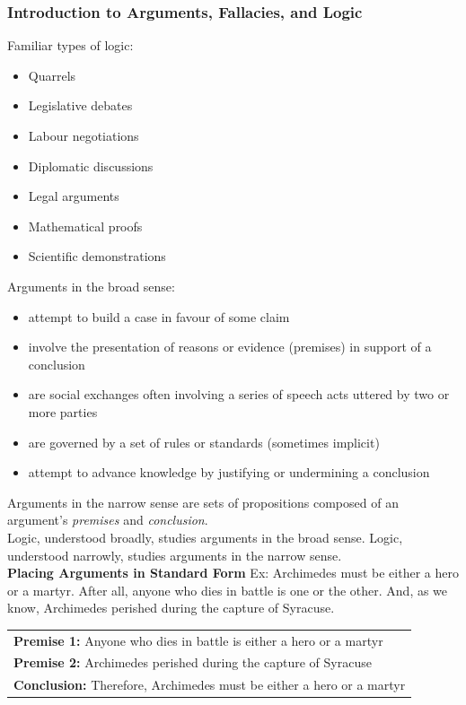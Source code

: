 \documentclass[11pt, fleqn]{article}
\begin{document}
\subsubsection{Introduction to Arguments, Fallacies, and Logic}
Familiar types of logic:
\begin{itemize}
    \item Quarrels
    \item Legislative debates
    \item Labour negotiations
    \item Diplomatic discussions
    \item Legal arguments
    \item Mathematical proofs
    \item Scientific demonstrations
\end{itemize}
Arguments in the broad sense:
\begin{itemize}
    \item attempt to build a case in favour of some claim
    \item involve the presentation of reasons or evidence (premises) in support of a conclusion
    \item are social exchanges often involving a series of speech acts uttered by two or more parties
    \item are governed by a set of rules or standards (sometimes implicit)
    \item attempt to advance knowledge by justifying or undermining a conclusion
\end{itemize}
Arguments in the narrow sense are sets of propositions composed of an argument's \textit{premises} and \textit{conclusion}.\\
Logic, understood broadly, studies arguments in the broad sense.
Logic, understood narrowly, studies arguments in the narrow sense.\\

\textbf{Placing Arguments in Standard Form}
Ex: Archimedes must be either a hero or a martyr. After all, anyone who dies in battle is one or the other. And, as we know, Archimedes perished during the capture of Syracuse.\\

\begin{tabular}{p{16cm}}
\textbf{Premise 1:} Anyone who dies in battle is either a hero or a martyr\\
\textbf{Premise 2:} Archimedes perished during the capture of Syracuse\\
\hline
\textbf{Conclusion:} Therefore, Archimedes must be either a hero or a martyr
\end{tabular}\\
\end{document}
